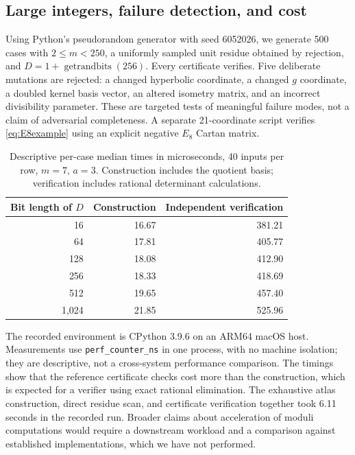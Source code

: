\documentclass[11pt]{article}
\theoremstyle{remark}\newtheorem{remark}[theorem]{Remark}
\begin{document}
\subsection{Large integers, failure detection, and cost}
Using Python's pseudorandom generator with seed 6052026, we generate 500 cases with $2\leq m<250$, a uniformly sampled unit residue obtained by rejection, and $D=1+\operatorname{getrandbits}(256)$. Every certificate verifies. Five deliberate mutations are rejected: a changed hyperbolic coordinate, a changed $g$ coordinate, a doubled kernel basis vector, an altered isometry matrix, and an incorrect divisibility parameter. These are targeted tests of meaningful failure modes, not a claim of adversarial completeness. A separate 21-coordinate script verifies \eqref{eq:E8example} using an explicit negative $E_8$ Cartan matrix.

\begin{table}[ht]
\centering
\caption{Descriptive per-case median times in microseconds, 40 inputs per row, $m=7$, $a=3$. Construction includes the quotient basis; verification includes rational determinant calculations.}\label{tab:timing}
\begin{tabular}{rrr}\toprule
Bit length of $D$ & Construction & Independent verification\\\midrule
16&16.67&381.21\\
64&17.81&405.77\\
128&18.08&412.90\\
256&18.33&418.69\\
512&19.65&457.40\\
1,024&21.85&525.96\\\bottomrule
\end{tabular}
\end{table}

The recorded environment is CPython 3.9.6 on an ARM64 macOS host. Measurements use \texttt{perf\_counter\_ns} in one process, with no machine isolation; they are descriptive, not a cross-system performance comparison. The timings show that the reference certificate checks cost more than the construction, which is expected for a verifier using exact rational elimination. The exhaustive atlas construction, direct residue scan, and certificate verification together took 6.11 seconds in the recorded run. Broader claims about acceleration of moduli computations would require a downstream workload and a comparison against established implementations, which we have not performed.
\end{document}
